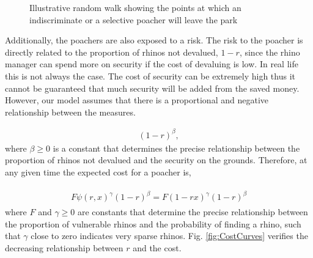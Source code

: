 \documentclass[10pt]{article}
\begin{document}
\begin{figure}[!htbp]
\begin{center}
    \end{center}
    \caption{Illustrative random walk showing the points at which an
    indiscriminate or a selective poacher will leave the park}

    \label{fig:random_walk}
\end{figure}

Additionally, the poachers are also exposed to a risk. The risk to the poacher is
directly related to the proportion of rhinos not devalued, \(1 - r\), since
the rhino manager can spend more on security if the cost of devaluing is low.
In real life this is not always the case. The cost of security can be extremely
high thus it cannot be guaranteed that much security will be added from the
saved money. However, our model assumes that there is a proportional and negative
relationship between the measures.

\begin{eqnarray}
    \label{eqn:risk}
    (1 - r)^{\beta},
\end{eqnarray}
where \(\beta \geq 0\) is a constant that determines the precise relationship between
the proportion of rhinos not devalued and the security on the grounds. Therefore,
at any given time the expected cost for a poacher is,

\begin{eqnarray}
    \label{eqn:individual_cost}
    \begin{array}{l}
    F \psi(r, x)^{\gamma} (1 - r)^{\beta} = F (1 - rx) ^{\gamma} (1 - r) ^{\beta}
    \end{array}
\end{eqnarray}
where \(F\) and \(\gamma \geq 0\) are constants that determine the precise relationship
between the proportion of vulnerable rhinos and the probability of finding a rhino,
such that \(\gamma\) close to zero indicates very sparse rhinos. Fig.
\ref{fig:CostCurves} verifies the decreasing relationship between \(r\) and the
cost.
\end{document}
